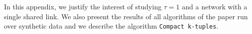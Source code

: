 \documentclass[a4paper,UKenglish,cleveref, autoref, thm-restate]{lipics-v2019}
\newcommand\pma{\textsc{pma}\xspace}
\newcommand\compactpair{\texttt{Compact Pairs}\xspace}
\begin{document}
 






\newpage
\appendix

\label{sec:appendix}


In this appendix, we justify the interest of studying $\tau = 1$ and a network with a single shared link.
We also present the results of all algorithms of the paper run over synthetic data and we describe the algorithm \texttt{Compact k-tuples}.
\end{document}
